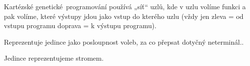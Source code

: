 \documentclass[12pt]{article}					%
\begin{document}
\begin{definice}
	Kartézské genetické programování používá „síť“ uzlů, kde v uzlu volíme funkci a pak volíme, které výstupy jdou jako vstup do kterého uzlu (vždy jen zleva = od vstupu programu doprava = k výstupu programu).
\end{definice}

\begin{definice}
	Reprezentuje jedince jako posloupnost voleb, za co přepsat dotyčný neterminál..
\end{definice}

\begin{definice}
	Jedince reprezentujeme stromem.
\end{definice}
\end{document}
